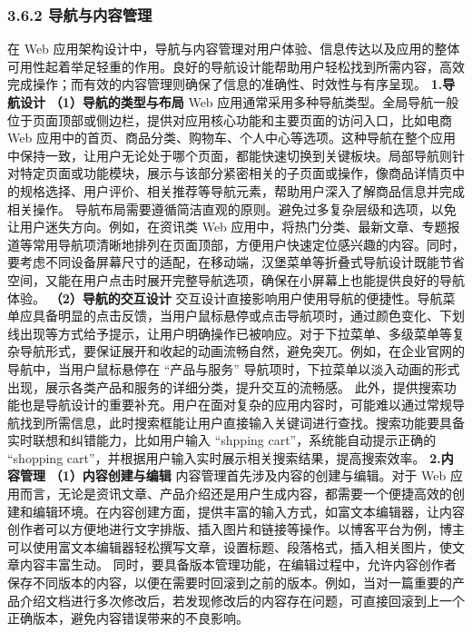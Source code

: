 \subsubsection{3.6.2 导航与内容管理}\label{ux5bfcux822aux4e0eux5185ux5bb9ux7ba1ux7406} 在 Web
应用架构设计中，导航与内容管理对用户体验、信息传达以及应用的整体可用性起着举足轻重的作用。良好的导航设计能帮助用户轻松找到所需内容，高效完成操作；而有效的内容管理则确保了信息的准确性、时效性与有序呈现。 \textbf{1.导航设计}
\textbf{（1）导航的类型与布局} Web 应用通常采用多种导航类型。全局导航一般位于页面顶部或侧边栏，提供对应用核心功能和主要页面的访问入口，比如电商 Web
应用中的首页、商品分类、购物车、个人中心等选项。这种导航在整个应用中保持一致，让用户无论处于哪个页面，都能快速切换到关键板块。局部导航则针对特定页面或功能模块，展示与该部分紧密相关的子页面或操作，像商品详情页中的规格选择、用户评价、相关推荐等导航元素，帮助用户深入了解商品信息并完成相关操作。
导航布局需要遵循简洁直观的原则。避免过多复杂层级和选项，以免让用户迷失方向。例如，在资讯类 Web
应用中，将热门分类、最新文章、专题报道等常用导航项清晰地排列在页面顶部，方便用户快速定位感兴趣的内容。同时，要考虑不同设备屏幕尺寸的适配，在移动端，汉堡菜单等折叠式导航设计既能节省空间，又能在用户点击时展开完整导航选项，确保在小屏幕上也能提供良好的导航体验。
\textbf{（2）导航的交互设计}
交互设计直接影响用户使用导航的便捷性。导航菜单应具备明显的点击反馈，当用户鼠标悬停或点击导航项时，通过颜色变化、下划线出现等方式给予提示，让用户明确操作已被响应。对于下拉菜单、多级菜单等复杂导航形式，要保证展开和收起的动画流畅自然，避免突兀。例如，在企业官网的导航中，当用户鼠标悬停在
``产品与服务'' 导航项时，下拉菜单以淡入动画的形式出现，展示各类产品和服务的详细分类，提升交互的流畅感。
此外，提供搜索功能也是导航设计的重要补充。用户在面对复杂的应用内容时，可能难以通过常规导航找到所需信息，此时搜索框能让用户直接输入关键词进行查找。搜索功能要具备实时联想和纠错能力，比如用户输入 ``shpping
cart''，系统能自动提示正确的 ``shopping cart''，并根据用户输入实时展示相关搜索结果，提高搜索效率。 \textbf{2.内容管理} \textbf{（1）内容创建与编辑} 内容管理首先涉及内容的创建与编辑。对于
Web
应用而言，无论是资讯文章、产品介绍还是用户生成内容，都需要一个便捷高效的创建和编辑环境。在内容创建方面，提供丰富的输入方式，如富文本编辑器，让内容创作者可以方便地进行文字排版、插入图片和链接等操作。以博客平台为例，博主可以使用富文本编辑器轻松撰写文章，设置标题、段落格式，插入相关图片，使文章内容丰富生动。
同时，要具备版本管理功能，在编辑过程中，允许内容创作者保存不同版本的内容，以便在需要时回滚到之前的版本。例如，当对一篇重要的产品介绍文档进行多次修改后，若发现修改后的内容存在问题，可直接回滚到上一个正确版本，避免内容错误带来的不良影响。
